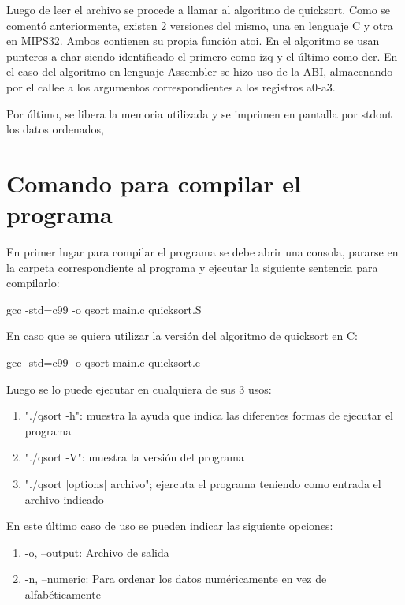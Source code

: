 \documentclass[a4paper,10pt]{article}
\numberwithin{equation}{section}
\numberwithin{figure}{section}
\begin{document}
Luego de leer el archivo se procede a llamar al algoritmo de quicksort. Como se comentó anteriormente, existen 2 versiones del mismo, una en lenguaje C y otra en MIPS32. Ambos contienen su propia función atoi. En el algoritmo se usan punteros a char siendo identificado el primero como izq y el último como der. En el caso del algoritmo en lenguaje Assembler se hizo uso de la ABI, almacenando por el callee a los argumentos correspondientes a los registros a0-a3.

Por último, se libera la memoria utilizada y se imprimen en pantalla por stdout los datos ordenados,





\section{Comando para compilar el programa}

En primer lugar para compilar el programa se debe abrir una consola, pararse en la carpeta correspondiente al programa y ejecutar la siguiente sentencia para compilarlo:

\begin{center}
gcc -std=c99 -o qsort main.c quicksort.S
\end{center}

En caso que se quiera utilizar la versión del algoritmo de quicksort en C:

\begin{center}
gcc -std=c99 -o qsort main.c quicksort.c
\end{center}


Luego se lo puede ejecutar en cualquiera de sus 3 usos:

\begin{enumerate}
	\item "./qsort -h": muestra la ayuda que indica las diferentes formas de ejecutar el programa
	\item "./qsort -V": muestra la versión del programa
	\item "./qsort [options] archivo"; ejercuta el programa teniendo como entrada el archivo indicado
\end{enumerate}


En este último caso de uso se pueden indicar las siguiente opciones:

\begin{enumerate}
	\item -o, --output: Archivo de salida
	\item -n, --numeric: Para ordenar los datos numéricamente en vez de alfabéticamente
\end{enumerate}
\end{document}
